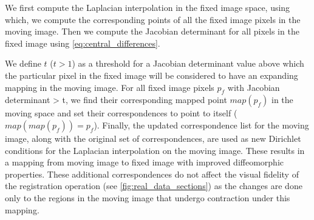 \documentclass[lettersize,journal]{IEEEtran}
\begin{document}


We first compute the Laplacian interpolation in the fixed image space, using which, we compute the corresponding points of all the fixed image pixels in the moving image. Then we compute the Jacobian determinant for all pixels in the fixed image using \autoref{eq:central_differences}. 


We define $t$ ($t>1$) as a threshold for a Jacobian determinant value above which the particular pixel in the fixed image will be considered to have an expanding mapping in the moving image. For all fixed image pixels $p_f$ with Jacobian determinant > t, we find their corresponding mapped point $map(p_f)$ in the moving space and set their correspondences to point to itself ($map(map(p_f))=p_f$).
Finally, the updated correspondence list for the moving image, along with the original set of correspondences, are used as new Dirichlet conditions for the Laplacian interpolation on the moving image. These results in a mapping from moving image to fixed image with improved diffeomorphic properties.
These additional correspondences do not affect the visual fidelity of the registration operation (see \autoref{fig:real_data_sections}) as the changes are done only to the regions in the moving image that undergo contraction under this mapping. 



 
\end{document}

